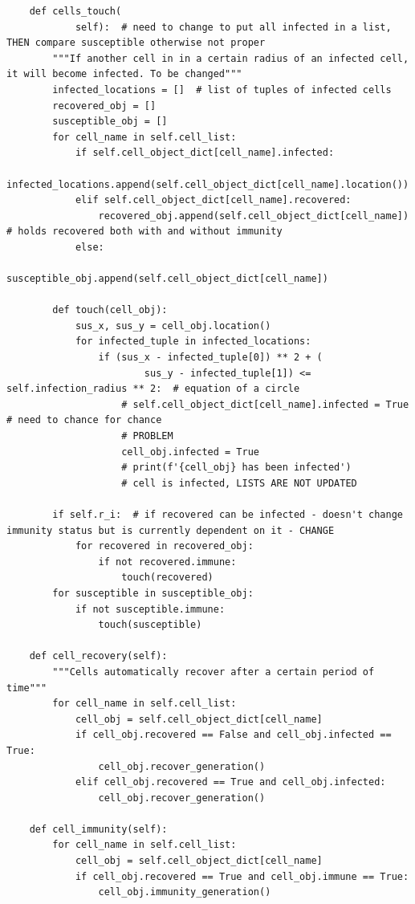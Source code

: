 \documentclass[11pt, a4paper]{article}
\begin{document}
\begin{lstlisting}
    def cells_touch(
            self):  # need to change to put all infected in a list, THEN compare susceptible otherwise not proper
        """If another cell in in a certain radius of an infected cell, it will become infected. To be changed"""
        infected_locations = []  # list of tuples of infected cells
        recovered_obj = []
        susceptible_obj = []
        for cell_name in self.cell_list:
            if self.cell_object_dict[cell_name].infected:
                infected_locations.append(self.cell_object_dict[cell_name].location())
            elif self.cell_object_dict[cell_name].recovered:
                recovered_obj.append(self.cell_object_dict[cell_name])  # holds recovered both with and without immunity
            else:
                susceptible_obj.append(self.cell_object_dict[cell_name])

        def touch(cell_obj):
            sus_x, sus_y = cell_obj.location()
            for infected_tuple in infected_locations:
                if (sus_x - infected_tuple[0]) ** 2 + (
                        sus_y - infected_tuple[1]) <= self.infection_radius ** 2:  # equation of a circle
                    # self.cell_object_dict[cell_name].infected = True  # need to chance for chance
                    # PROBLEM
                    cell_obj.infected = True
                    # print(f'{cell_obj} has been infected')
                    # cell is infected, LISTS ARE NOT UPDATED

        if self.r_i:  # if recovered can be infected - doesn't change immunity status but is currently dependent on it - CHANGE
            for recovered in recovered_obj:
                if not recovered.immune:
                    touch(recovered)
        for susceptible in susceptible_obj:
            if not susceptible.immune:
                touch(susceptible)

    def cell_recovery(self):
        """Cells automatically recover after a certain period of time"""
        for cell_name in self.cell_list:
            cell_obj = self.cell_object_dict[cell_name]
            if cell_obj.recovered == False and cell_obj.infected == True:
                cell_obj.recover_generation()
            elif cell_obj.recovered == True and cell_obj.infected:
                cell_obj.recover_generation()

    def cell_immunity(self):
        for cell_name in self.cell_list:
            cell_obj = self.cell_object_dict[cell_name]
            if cell_obj.recovered == True and cell_obj.immune == True:
                cell_obj.immunity_generation()


\end{lstlisting}
\end{document}
